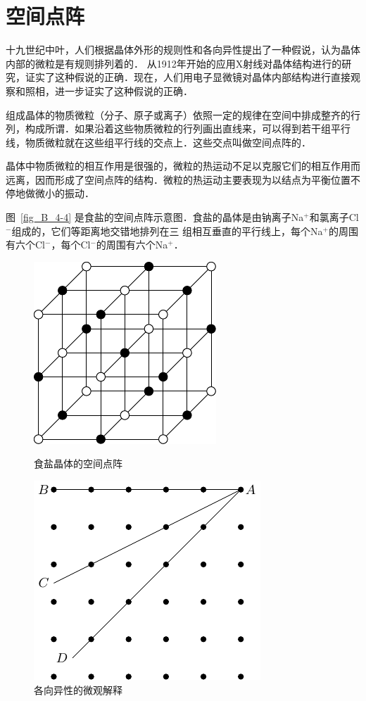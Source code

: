 \section{空间点阵}
十九世纪中叶，人们根据晶体外形的规则性和各向异性提出了一种假说，认为晶体内部的微粒是有规则排列着的．
从1912年开始的应用X射线对晶体结构进行的研究，证实了这种假说的正确．现在，人们用电子显微镜对晶体内部结构进行直接观察和照相，进一步证实了这种假说的正确．

组成晶体的物质微粒（分子、原子或离子）依照一定的规律在空间中排成整齐的行列，构成所谓．如果沿着这些物质微粒的行列画出直线来，可以得到若干组平行线，物质微粒就在这些组平行线的交点上．这些交点叫做空间点阵的．

晶体中物质微粒的相互作用是很强的，微粒的热运动不足以克服它们的相互作用而远离，因而形成了空间点阵的结构．微粒的热运动主要表现为以结点为平衡位置不停地做微小的振动．


图~\ref{fig_B_4-4} 是食盐的空间点阵示意图．食盐的晶体是由钠离子Na$^+$和氯离子Cl$^-$组成的，它们等距离地交错地排列在三
组相互垂直的平行线上，每个Na$^+$的周围有六个Cl$^-$，每个Cl$^-$的周围有六个Na$^+$．

\begin{figure}[htbp]
	\centering
	\begin{minipage}[t]{0.48\linewidth}
		\centering
		\includegraphics{fig/B/4-4.pdf}
		\caption{食盐晶体的空间点阵}\label{fig_B_4-4}
	\end{minipage}
	\begin{minipage}[t]{0.48\linewidth}
		\centering
		\includegraphics{fig/B/4-5.pdf}
		\caption{各向异性的微观解释}\label{fig_B_4-5}
	\end{minipage}
\end{figure}


